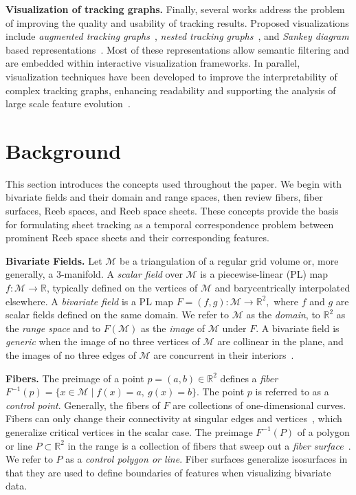 \documentclass[review]{vgtc}                          %
\newcommand{\R}{\mathbb{R}}
\newcommand{\Domain}{\mathcal{M}}
\newcommand{\myparagraph}[1]{\vspace{1mm} \noindent \textbf{#1}}
\begin{document}
\myparagraph{Visualization of tracking graphs.} Finally, several works address the problem of improving the quality and usability of tracking results. Proposed visualizations include \emph{augmented tracking graphs}~\cite{Bremer2010}, \emph{nested tracking graphs}~\cite{lukasczyk2017nested,Nilsson2022Cyclone}, and \emph{Sankey diagram} based representations~\cite{Rasheed2024,Evers2026}. Most of these representations allow semantic filtering and are embedded within interactive visualization frameworks. In parallel, visualization techniques have been developed to improve the interpretability of complex tracking graphs, enhancing readability and supporting the analysis of large scale feature evolution~\cite{Kopp2019,Dobler2024}.


\section{Background}
This section introduces the concepts used throughout the paper. We begin with bivariate fields and their domain and range spaces, then review fibers, fiber surfaces, Reeb spaces, and Reeb space sheets. These concepts provide the basis for formulating sheet tracking as a temporal correspondence problem between prominent Reeb space sheets and their corresponding features.

\myparagraph{Bivariate Fields.} Let $\Domain$ be a triangulation of a regular grid volume or, more generally, a 3-manifold.
A \textit{scalar field} over $\Domain$ is a piecewise-linear (PL) map $f:\Domain \to \R$, typically defined on the vertices of $\Domain$ and barycentrically interpolated elsewhere.
A \textit{bivariate field} is a PL map $F=(f,g):\Domain \to \R^2,$
where $f$ and $g$ are scalar fields defined on the same domain.
We refer to $\Domain$ as the \textit{domain}, to $\R^2$ as the \textit{range space} and to $F(\Domain)$ as the \textit{image} of $\Domain$ under $F$.
A bivariate field is \textit{generic} when the image of no three vertices of $\Domain$ are collinear in the plane, and the images of no three edges of $\Domain$ are concurrent in their interiors~\cite{Hristov2025b}.

\myparagraph{Fibers.} The preimage of a point $p=(a,b)\in\R^2$ defines a \emph{fiber}
$F^{-1}(p)=\{x \in \Domain \mid f(x)=a,\ g(x)=b\}$.
The point $p$ is referred to as a \emph{control point}.
Generally, the fibers of $F$ are collections of one-dimensional curves.
Fibers can only change their connectivity at singular edges and vertices~\cite{hristovHypersweepsConvectiveClouds2022}, which generalize critical vertices in the scalar case.
The preimage $F^{-1}(P)$ of a polygon or line $P \subset \R^2$ in the range is a collection of fibers that sweep out a \emph{fiber surface}~\cite{Carr2015}.
We refer to $P$ as a \emph{control polygon or line}.
Fiber surfaces generalize isosurfaces in that they are used to define boundaries of features when visualizing bivariate data.
\end{document}
